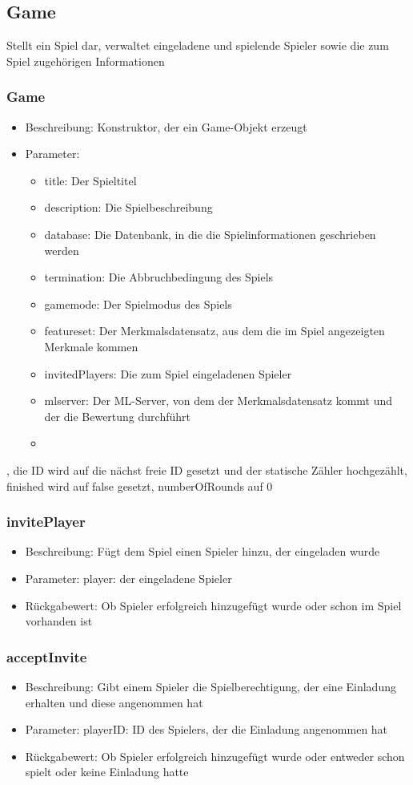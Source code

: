 \documentclass[a4paper]{scrreprt}
\begin{document}
	\subsection{Game}
	Stellt ein Spiel dar, verwaltet eingeladene und spielende Spieler sowie die zum Spiel zugehörigen Informationen
	\subsubsection{Game}
	\begin{itemize}
	\item Beschreibung: Konstruktor, der ein Game-Objekt erzeugt
	\item Parameter: 
	\begin{itemize}
	\item title: Der Spieltitel
	\item description: Die Spielbeschreibung
	\item database: Die Datenbank, in die die Spielinformationen geschrieben werden
	\item termination: Die Abbruchbedingung des Spiels
	\item gamemode: Der Spielmodus des Spiels
	\item featureset: Der Merkmalsdatensatz, aus dem die im Spiel angezeigten Merkmale kommen
	\item invitedPlayers: Die zum Spiel eingeladenen Spieler
	\item mlserver: Der ML-Server, von dem der Merkmalsdatensatz kommt und der die Bewertung durchführt
	\item 
	\end{itemize}
	\end{itemize}
	, die ID wird auf die nächst freie ID gesetzt und der statische Zähler hochgezählt, finished wird auf false gesetzt, numberOfRounds auf 0	
	\subsubsection{invitePlayer}
	\begin{itemize}
		\item Beschreibung: Fügt dem Spiel einen Spieler hinzu, der eingeladen wurde
		\item Parameter: player: der eingeladene Spieler
		\item Rückgabewert: Ob Spieler erfolgreich hinzugefügt wurde oder schon im Spiel vorhanden ist
	\end{itemize}
	\subsubsection{acceptInvite}
	\begin{itemize}
		\item Beschreibung: Gibt einem Spieler die Spielberechtigung, der eine Einladung erhalten und diese angenommen hat
		\item Parameter: playerID: ID des Spielers, der die Einladung angenommen hat
		\item Rückgabewert: Ob Spieler erfolgreich hinzugefügt wurde oder entweder schon spielt oder keine Einladung hatte
	\end{itemize}
\end{document}
